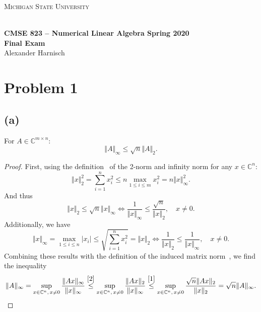 \documentclass[a4paper, 11pt]{article}
\begin{document}
\newtheorem{lemma}{Lemma}
\noindent
\centerline{\small{\textsc{Michigan State University}}} \\
\large{\textbf{CMSE 823 – Numerical Linear Algebra \hfill Spring 2020 \\
Final Exam} \\
Alexander Harnisch \\}
\noindent\makebox[\linewidth]{\rule{\textwidth}{0.4pt}}

\section*{Problem 1}
\subsection*{(a)}
For $A \in \mathbb{C}^{m\times n}$:
\begin{equation}
  \Vert A\Vert_\infty \leq \sqrt{n}\Vert A \Vert_2.
  \label{eqn:a}
\end{equation}

\begin{proof}
First, using the definition~\cite[(3.2)]{tb} of the 2-norm and infinity norm
for any $x \in \mathbb{C}^n$:
\begin{equation*}
  \Vert x \Vert_2^2 = \sum_{i = 1}^n x_i^2 \leq n \max_{1 \leq i \leq m} x_i^2 = n \Vert x\Vert_\infty^2.
\end{equation*}
And thus
\begin{equation}
  \Vert x \Vert_2 \leq \sqrt{n} \Vert x \Vert_\infty \Leftrightarrow
  \frac{1}{\Vert x \Vert_\infty} \leq \frac{\sqrt{n}}{\Vert x \Vert_2},\quad x \neq 0.
  \label{1}
\end{equation}
Additionally, we have
\begin{equation}
  \Vert x \Vert_\infty = \max_{1 \leq i \leq n} \vert x_i \vert \leq
  \sqrt{\sum_{i=1}^n x_i^2} = \Vert x\Vert_2 \Leftrightarrow \frac{1}{\Vert
  x\Vert_2} \leq \frac{1}{\Vert x\Vert_\infty}, \quad x \neq 0.
  \label{2}
\end{equation}
Combining these results with the definition of the induced matrix
norm~\cite[(3.6)]{tb}, we find the inequality
\begin{equation*}
  \Vert A \Vert_\infty = \sup_{x \in \mathbb{C}^n,\,x \neq 0} \frac{\Vert Ax
  \Vert_\infty}{\Vert x \Vert_\infty} \stackrel{\eqref{2}}{\leq}
  \sup_{x \in \mathbb{C}^n,\,x \neq 0} \frac{\Vert Ax \Vert_2}{\Vert x
  \Vert_\infty}
  \stackrel{\eqref{1}}{\leq}
  \sup_{x \in \mathbb{C}^n,\,x \neq 0} \frac{\sqrt{n}\Vert Ax \Vert_2}{\Vert x
  \Vert_2} = \sqrt{n} \Vert A \Vert_\infty.
\end{equation*}
\end{proof}
\end{document}
